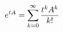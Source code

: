 \documentclass[preview]{standalone}
\begin{document}
\begin{align*}
\special{dvisvgm:raw <g id='unique000'>}e^{tA}=\displaystyle\sum_{k=0}^{\infty}\dfrac{t^kA^k}{k!}\special{dvisvgm:raw </g>}
\end{align*}
\end{document}
